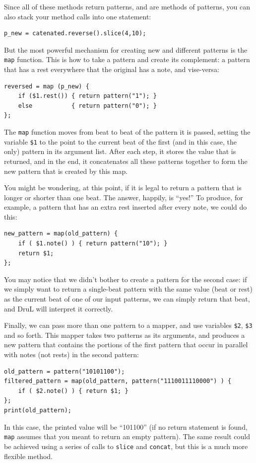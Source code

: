 Since all of these methods return patterns, and are methods of patterns, you can also stack your method calls into one statement:

\begin{lstlisting}
p_new = catenated.reverse().slice(4,10);
\end{lstlisting}

But the most powerful mechanism for creating new and different patterns is the {\tt map} function.  This is how to take a pattern and create its complement: a pattern that has a rest everywhere that the original has a note, and vise-versa:

\begin{lstlisting}
reversed = map (p_new) {
	if ($1.rest()) { return pattern("1"); }
	else 	       { return pattern("0"); }
};
\end{lstlisting}

The {\tt map} function moves from beat to beat of the pattern it is passed, setting the variable {\tt \$1} to the point to the current beat of the first (and in this case, the only) pattern in its argument list.  After each step, it stores the value that is returned, and in the end, it concatenates all these patterns together to form the new pattern that is created by this map.

You might be wondering, at this point, if it is legal to return a pattern that is longer or shorter than one beat.  The answer, happily, is ``yes!''  To produce, for example, a pattern that has an extra rest inserted after every note, we could do this:

\begin{lstlisting}
new_pattern = map(old_pattern) {
	if ( $1.note() ) { return pattern("10"); }
	return $1;
};
\end{lstlisting}
You may notice that we didn't bother to create a pattern for the second case: if we simply want to return a single-beat pattern with the same value (beat or rest) as the current beat of one of our input patterns, we can simply return that beat, and DruL will interpret it correctly.

Finally, we can pass more than one pattern to a mapper, and use variables {\tt \$2}, {\tt \$3} and so forth.  This mapper takes two patterns as its arguments, and produces a new pattern that contains the portions of the first pattern that occur in parallel with notes (not rests) in the second pattern:
\begin{lstlisting}
old_pattern = pattern("10101100");
filtered_pattern = map(old_pattern, pattern("1110011110000") ) {
	if ( $2.note() ) { return $1; }
};
print(old_pattern);
\end{lstlisting}
In this case, the printed value will be ``101100'' (if no return statement is found, {\tt map} assumes that you meant to return an empty pattern).
The same result could be achieved using a series of calls to {\tt slice} and {\tt concat}, but this is a much more flexible method.

